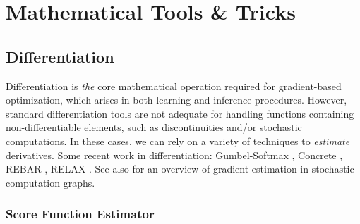 \chapter{Mathematical Tools \& Tricks}
\label{chap: math tools and tricks}

\section{Differentiation}
\label{sec: differentiation}

Differentiation is \textit{the} core mathematical operation required for gradient-based optimization, which arises in both learning and inference procedures. However, standard differentiation tools are not adequate for handling functions containing non-differentiable elements, such as discontinuities and/or stochastic computations. In these cases, we can rely on a variety of techniques to \textit{estimate} derivatives. Some recent work in differentiation: Gumbel-Softmax \cite{jang2016categorical}, Concrete \cite{maddison2016concrete}, REBAR \cite{tucker2017rebar}, RELAX \cite{grathwohl2017backpropagation}. See also \cite{schulman2015gradient} for an overview of gradient estimation in stochastic computation graphs.

\subsection{Score Function Estimator}
\label{subsec: score function estimator}

